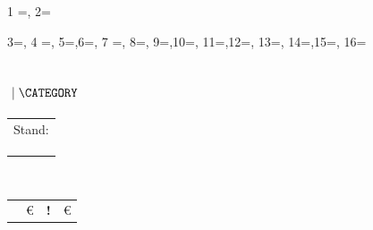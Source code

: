 \csvreader[separator=pipe,respect all]{\kneipenCSV}
{1 =\name, 2=\address,  3=\beerprice,
	4 =\softdrinkprice,    5=\web ,6=\phone,
	7 =\food, 8=\beer,     9=\wifi,10=\cocktails,
	11=\togo,12=\smoking,  13=\smokingBan,
	14=\desc,15=\category, 16=\update
}{
	\vspace{-1.65em}
	\noindent
	\subsection*{\name \small{$~\mid \MakeUppercase\category$}}
	\vspace{-1.45em}
	\begin{minipage}{0.6\textwidth}
		\begin{tabular}{cl}
			\multicolumn{2}{l}{Stand: \update} \\
			\faMapMarker & \is{\address} \\
			\faPhone     & \is{\phone}   \\
			\faLaptop    & \is{\web}
		\end{tabular}
	\end{minipage}
	\hfill
	\begin{minipage}{0.4\textwidth}
		\vspace{-1.25em}
		\features{\has{\food}}{\has{\beer}}{\has{\cocktails}}{\has{\wifi}}
		{\has{\togo}}{\has{\smoking}}{\has{\smokingBan}}\\[0.5em]
		\begin{tabular}{rlll}
			\faBeer\faEuroSign               & \beerprice\euro         %
			  & \textbf{!}\faBeer\faEuroSign & \softdrinkprice\euro \\ %
		\end{tabular}
	\end{minipage}\\[.5em]
	\desc\\
}
